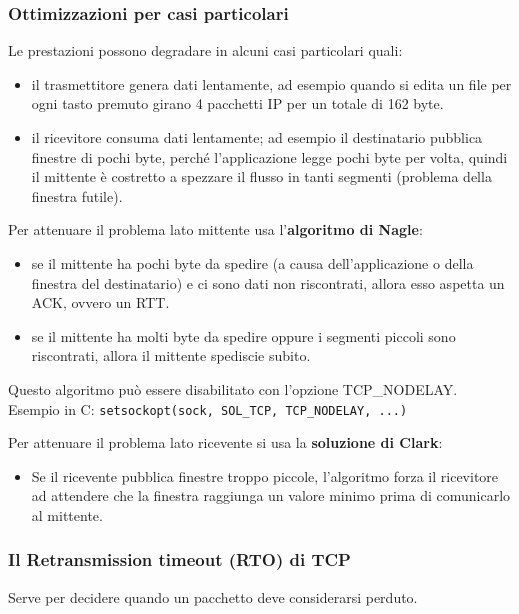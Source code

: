         \subsubsection{Ottimizzazioni per casi particolari}
            Le prestazioni possono degradare in alcuni casi particolari quali:
            \begin{itemize}
                \item il trasmettitore genera dati lentamente, ad esempio quando si edita un file per ogni tasto premuto girano 4 pacchetti IP per un totale di 162 byte.
                \item il ricevitore consuma dati lentamente; ad esempio il destinatario pubblica finestre di pochi byte, perché l’applicazione legge pochi byte per volta, quindi il mittente è costretto a spezzare il flusso in tanti segmenti (problema della finestra futile).
            \end{itemize}

            Per attenuare il problema lato mittente usa l'\textbf{algoritmo di Nagle}:
            \begin{itemize}
                \item se il mittente ha pochi byte da spedire (a causa dell'applicazione o della finestra del destinatario) e ci sono dati non riscontrati, allora esso aspetta un ACK, ovvero un RTT.
                \item se il mittente ha molti byte da spedire oppure i segmenti piccoli sono riscontrati, allora il mittente spediscie subito.
            \end{itemize}

            Questo algoritmo può essere disabilitato con l'opzione TCP\_NODELAY. Esempio in C: \verb:setsockopt(sock, SOL_TCP, TCP_NODELAY, ...):

            Per attenuare il problema lato ricevente si usa la \textbf{soluzione di Clark}:
            \begin{itemize}
                \item Se il ricevente pubblica finestre troppo piccole, l'algoritmo forza il ricevitore ad attendere che la finestra raggiunga un valore minimo prima di comunicarlo al mittente.
            \end{itemize}

        \subsubsection{Il Retransmission timeout (RTO) di TCP}
            Serve per decidere quando un pacchetto deve considerarsi perduto.
        
